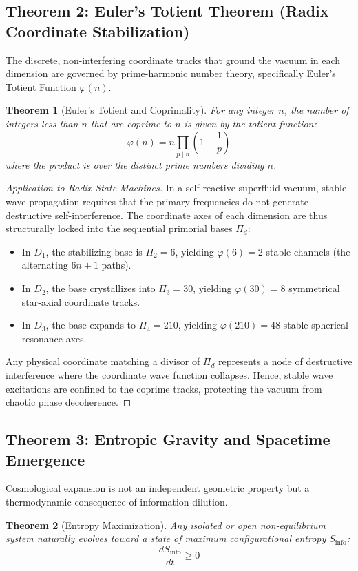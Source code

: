 \documentclass[11pt,a4paper]{article}
\theoremstyle{plain}
\newtheorem{theorem}{Theorem}[section] %
\theoremstyle{definition}
\theoremstyle{remark}
\begin{document}
\subsection{Theorem 2: Euler's Totient Theorem (Radix Coordinate Stabilization)}
The discrete, non-interfering coordinate tracks that ground the vacuum in each dimension are governed by prime-harmonic number theory, specifically Euler's Totient Function $\varphi(n)$.
\begin{theorem}[Euler's Totient and Coprimality]
For any integer $n$, the number of integers less than $n$ that are coprime to $n$ is given by the totient function:
\begin{equation}
\varphi(n) = n \prod_{p \mid n} \left(1 - \frac{1}{p}\right)
\end{equation}
where the product is over the distinct prime numbers dividing $n$.
\end{theorem}

\begin{proof}[Application to Radix State Machines]
In a self-reactive superfluid vacuum, stable wave propagation requires that the primary frequencies do not generate destructive self-interference. The coordinate axes of each dimension are thus structurally locked into the sequential primorial bases $\Pi_d$:
\begin{itemize}
    \item In $D_1$, the stabilizing base is $\Pi_2 = 6$, yielding $\varphi(6) = 2$ stable channels (the alternating $6n \pm 1$ paths).
    \item In $D_2$, the base crystallizes into $\Pi_3 = 30$, yielding $\varphi(30) = 8$ symmetrical star-axial coordinate tracks.
    \item In $D_3$, the base expands to $\Pi_4 = 210$, yielding $\varphi(210) = 48$ stable spherical resonance axes.
\end{itemize}
Any physical coordinate matching a divisor of $\Pi_d$ represents a node of destructive interference where the coordinate wave function collapses. Hence, stable wave excitations are confined to the coprime tracks, protecting the vacuum from chaotic phase decoherence.
\end{proof}

\subsection{Theorem 3: Entropic Gravity and Spacetime Emergence}
Cosmological expansion is not an independent geometric property but a thermodynamic consequence of information dilution.
\begin{theorem}[Entropy Maximization]
Any isolated or open non-equilibrium system naturally evolves toward a state of maximum configurational entropy $S_{\text{info}}$:
\begin{equation}
\frac{dS_{\text{info}}}{dt} \ge 0
\end{equation}
\end{theorem}
\end{document}
